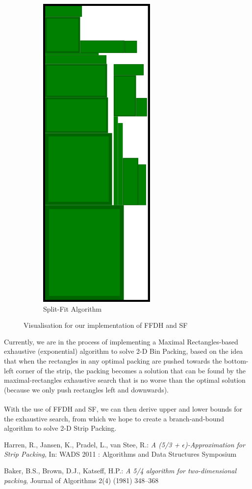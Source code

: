\documentclass{article}
\begin{document}
\begin{figure}[ht]
\begin{subfigure}{.35\textwidth}
  \includegraphics[width=.5\linewidth]{SplitFitrun.png}
  \caption{Split-Fit Algorithm}
  \label{fig:splitfitrun}
\end{subfigure}
  \caption{Visualisation for our implementation of FFDH and SF}
  \label{fig:ffdhsfrun}
\end{figure}

\noindent
Currently, we are in the process of implementing a Maximal Rectangles-based exhaustive (exponential) algorithm to solve 2-D Bin Packing, based on the idea that when the rectangles in any optimal packing are pushed towards the bottom-left corner of the strip, the packing becomes a solution that can be found by the maximal-rectangles exhaustive search that is no worse than the optimal solution (because we only push rectangles left and downwards).\\\
\\
With the use of FFDH and SF, we can then derive upper and lower bounds for the exhaustive search, from which we hope to create a branch-and-bound algorithm to solve 2-D Strip Packing.

\begin{thebibliography}{9}
  Harren, R., Jansen, K., Pradel, L., van Stee, R.:
  \emph{A (5/3 + $\epsilon$)-Approximation for Strip Packing},
  In: WADS 2011 : Algorithms and Data Structures Symposium

  Baker, B.S., Brown, D.J., Katseff, H.P.:
  \emph{A 5/4 algorithm for two-dimensional packing},
  Journal of Algorithms 2(4) (1981) 348–368
\end{thebibliography}
\end{document}
